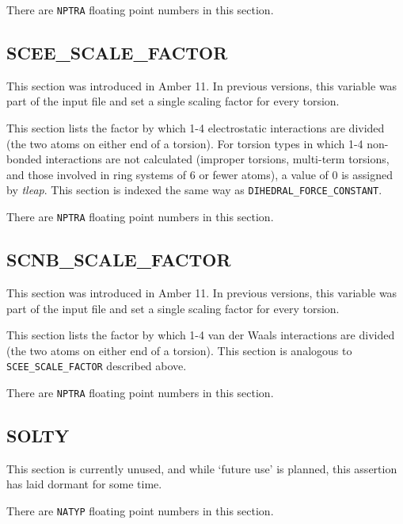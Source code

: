
\noindent There are {\tt NPTRA} floating point numbers in this section.

\subsection*{SCEE\_SCALE\_FACTOR}

This section was introduced in Amber 11. In previous versions, this variable was
part of the input file and set a single scaling factor for every torsion.

This section lists the factor by which 1-4 electrostatic interactions are
divided (\ie the two atoms on either end of a torsion). For torsion types in
which 1-4 non-bonded interactions are not calculated (\eg improper torsions,
multi-term torsions, and those involved in ring systems of 6 or fewer atoms), a
value of 0 is assigned by \emph{tleap}. This section is indexed the same way as
{\tt DIHEDRAL\_FORCE\_CONSTANT}.


\noindent There are {\tt NPTRA} floating point numbers in this section.

\subsection*{SCNB\_SCALE\_FACTOR}

This section was introduced in Amber 11. In previous versions, this variable was
part of the input file and set a single scaling factor for every torsion.

This section lists the factor by which 1-4 van der Waals interactions are
divided (\ie the two atoms on either end of a torsion). This section is
analogous to {\tt SCEE\_SCALE\_FACTOR} described above.


\noindent There are {\tt NPTRA} floating point numbers in this section.

\subsection*{SOLTY}

This section is currently unused, and while `future use' is planned, this
assertion has laid dormant for some time.


\noindent There are {\tt NATYP} floating point numbers in this section.

